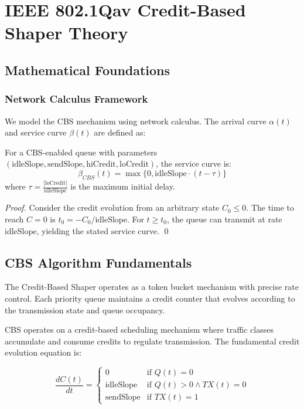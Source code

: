 \documentclass[10pt, journal, compsoc]{IEEEtran}
\begin{document}
\section{IEEE 802.1Qav Credit-Based Shaper Theory}

\subsection{Mathematical Foundations}

\subsubsection{Network Calculus Framework}

We model the CBS mechanism using network calculus. The arrival curve $\alpha(t)$ and service curve $\beta(t)$ are defined as:

\begin{theorem}
For a CBS-enabled queue with parameters $(\text{idleSlope}, \text{sendSlope}, \text{hiCredit}, \text{loCredit})$, the service curve is:
\begin{equation}
\beta_{CBS}(t) = \max\{0, \text{idleSlope} \cdot (t - \tau)\}
\end{equation}
where $\tau = \frac{|\text{loCredit}|}{\text{idleSlope}}$ is the maximum initial delay.
\end{theorem}

\begin{proof}
Consider the credit evolution from an arbitrary state $C_0 \leq 0$. The time to reach $C = 0$ is $t_0 = -C_0/\text{idleSlope}$. For $t \geq t_0$, the queue can transmit at rate $\text{idleSlope}$, yielding the stated service curve. \qed
\end{proof}

\subsection{CBS Algorithm Fundamentals}

The Credit-Based Shaper operates as a token bucket mechanism with precise rate control. Each priority queue maintains a credit counter that evolves according to the transmission state and queue occupancy.

CBS operates on a credit-based scheduling mechanism where traffic classes accumulate and consume credits to regulate transmission. The fundamental credit evolution equation is:

\begin{equation}
\frac{dC(t)}{dt} = \begin{cases}
0 & \text{if } Q(t) = 0 \\
\text{idleSlope} & \text{if } Q(t) > 0 \land TX(t) = 0 \\
\text{sendSlope} & \text{if } TX(t) = 1
\end{cases}
\end{equation}
\end{document}
